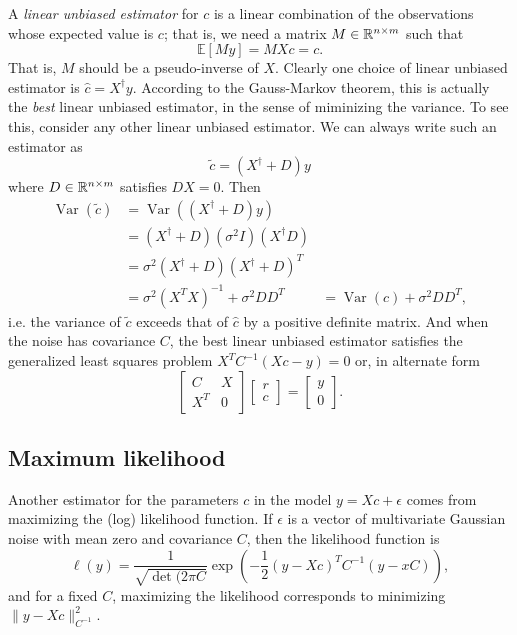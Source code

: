 \documentclass[12pt, leqno]{article} %
\begin{document}
A {\em linear unbiased estimator} for $c$ is a linear combination
of the observations whose expected value is $c$; that is, we
need a matrix $M \in \mathbb{R}^{n \times m}$ such that
\[
  \mathbb{E}[M y] = M X c = c.
\]
That is, $M$ should be a pseudo-inverse of $X$.  Clearly one choice of
linear unbiased estimator is $\hat{c} = X^\dagger y$.  According to
the Gauss-Markov theorem, this is actually the {\em best} linear
unbiased estimator, in the sense of miminizing the variance.  To see
this, consider any other linear unbiased estimator.  We can always
write such an estimator as
\[
  \tilde{c} = (X^\dagger + D) y
\]
where $D \in \mathbb{R}^{n \times m}$ satisfies $D X = 0$.  Then
\begin{align*}
  \operatorname{Var}(\tilde{c})
  &= \operatorname{Var}((X^\dagger + D) y) \\
  &= (X^\dagger + D) (\sigma^2 I) (X^\dagger D) \\
  &= \sigma^2 (X^\dagger + D) (X^\dagger + D)^T \\
  &= \sigma^2 (X^T X)^{-1} + \sigma^2 D D^T
  &= \operatorname{Var}(\hat{c}) + \sigma^2 D D^T,
\end{align*}
i.e. the variance of $\tilde{c}$ exceeds that of $\hat{c}$ by a
positive definite matrix.  And when the noise has covariance $C$, the best
linear unbiased estimator satisfies the generalized least squares problem
$X^T C^{-1} (Xc-y) = 0$ or, in alternate form
\[
  \begin{bmatrix} C & X \\ X^T & 0 \end{bmatrix}
  \begin{bmatrix} r \\ c \end{bmatrix} =
  \begin{bmatrix} y \\ 0 \end{bmatrix}.
\]

\subsection{Maximum likelihood}

Another estimator for the parameters $c$ in the model
$y = Xc + \epsilon$ comes from maximizing the (log) likelihood
function.  If $\epsilon$ is a vector of multivariate Gaussian noise
with mean zero and covariance $C$, then the likelihood function is
\[
  \ell(y) = \frac{1}{\sqrt{\det(2\pi C}} \exp\left( -\frac{1}{2} (y-Xc)^T C^{-1} (y-xC) \right),
\]
and for a fixed $C$, maximizing the likelihood corresponds to
minimizing $\|y-Xc\|_{C^{-1}}^2$.
\end{document}
